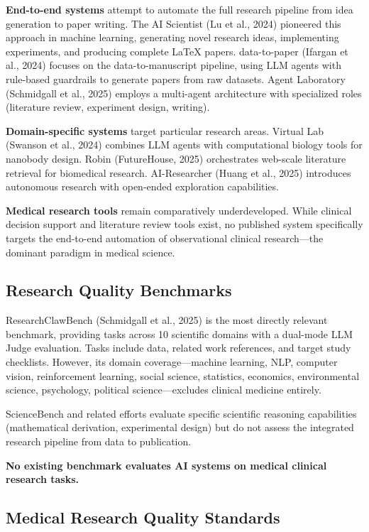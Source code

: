 \documentclass[12pt]{article}
\begin{document}
\textbf{End-to-end systems} attempt to automate the full research pipeline from idea generation to paper writing. The AI Scientist (Lu et al., 2024) pioneered this approach in machine learning, generating novel research ideas, implementing experiments, and producing complete LaTeX papers. data-to-paper (Ifargan et al., 2024) focuses on the data-to-manuscript pipeline, using LLM agents with rule-based guardrails to generate papers from raw datasets. Agent Laboratory (Schmidgall et al., 2025) employs a multi-agent architecture with specialized roles (literature review, experiment design, writing).

\textbf{Domain-specific systems} target particular research areas. Virtual Lab (Swanson et al., 2024) combines LLM agents with computational biology tools for nanobody design. Robin (FutureHouse, 2025) orchestrates web-scale literature retrieval for biomedical research. AI-Researcher (Huang et al., 2025) introduces autonomous research with open-ended exploration capabilities.

\textbf{Medical research tools} remain comparatively underdeveloped. While clinical decision support and literature review tools exist, no published system specifically targets the end-to-end automation of observational clinical research---the dominant paradigm in medical science.

\subsection{Research Quality Benchmarks}

ResearchClawBench (Schmidgall et al., 2025) is the most directly relevant benchmark, providing tasks across 10 scientific domains with a dual-mode LLM Judge evaluation. Tasks include data, related work references, and target study checklists. However, its domain coverage---machine learning, NLP, computer vision, reinforcement learning, social science, statistics, economics, environmental science, psychology, political science---excludes clinical medicine entirely.

ScienceBench and related efforts evaluate specific scientific reasoning capabilities (mathematical derivation, experimental design) but do not assess the integrated research pipeline from data to publication.

\textbf{No existing benchmark evaluates AI systems on medical clinical research tasks.}

\subsection{Medical Research Quality Standards}
\end{document}
